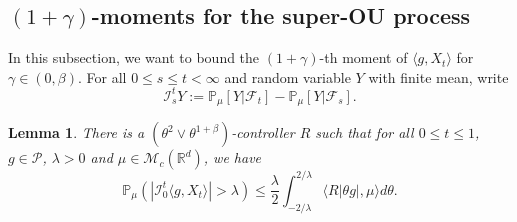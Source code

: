 \documentclass[12pt,a4paper]{amsart}
\theoremstyle{plain}
\newtheorem{lem}[thm]{Lemma}
\theoremstyle{definition}
\numberwithin{equation}{section}
\begin{document}
\subsection{$(1+\gamma)$-moments for the super-OU process}

 In this subsection,  we want to bound the $(1+\gamma)$-th moment of $\langle g ,X_t \rangle$ for $\gamma \in (0,\beta)$.
    For all $0 \leq s \leq t <\infty$ and  random variable $Y$ with finite mean, write
$$
    \mathcal I_s^t Y
  := \mathbb P_\mu[Y|\mathscr F_t] - \mathbb P_\mu[Y|\mathscr F_s].
$$

\begin{lem}
\label{lem: control pair for P(M>lambda)}
    There is a $(\theta^2\vee\theta^{1+\beta})$-controller $R$ such that for all $0\leq t\leq 1$, $g\in \mathcal P$, $\lambda >0$ and $\mu\in \mathcal M_c(\mathbb R^d)$, we have
\[
    \mathbb P_\mu ( |\mathcal{I}_0^t\langle g,X_t\rangle| > \lambda)
    \leq \frac{\lambda}{2}\int_{-2/\lambda}^{2/\lambda}\langle R|\theta g|,\mu\rangle d\theta.
\]
\end{lem}
\end{document}
